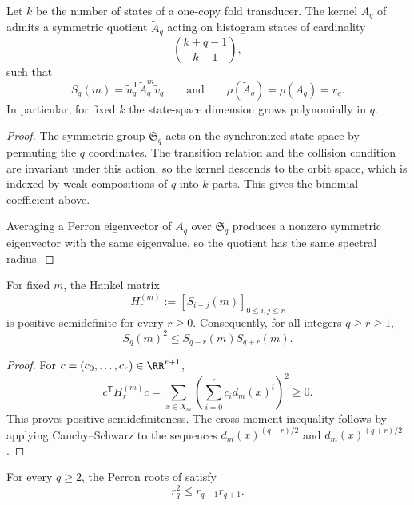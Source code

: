 \begin{theorem}
\label{thm:symmetric-compression}
Let \(k\) be the number of states of a one-copy fold transducer.  The kernel
\(A_q\) of  admits a symmetric quotient
\(\widetilde A_q\) acting on histogram states of cardinality
\[
  \binom{k+q-1}{k-1},
\]
such that
\[
  S_q(m)=\widetilde u_q^{\mathsf T}\widetilde A_q^m\widetilde v_q
  \qquad\text{and}\qquad
  \rho(\widetilde A_q)=\rho(A_q)=r_q.
\]
In particular, for fixed \(k\) the state-space dimension grows polynomially in
\(q\).
\end{theorem}

\begin{proof}
The symmetric group \(\mathfrak S_q\) acts on the synchronized state space by
permuting the \(q\) coordinates.  The transition relation and the collision
condition are invariant under this action, so the kernel descends to the orbit
space, which is indexed by weak compositions of \(q\) into \(k\) parts.  This
gives the binomial coefficient above.

Averaging a Perron eigenvector of \(A_q\) over \(\mathfrak S_q\) produces a
nonzero symmetric eigenvector with the same eigenvalue, so the quotient has the
same spectral radius.
\end{proof}

\begin{proposition}
\label{prop:hankel-psd}
For fixed \(m\), the Hankel matrix
\[
  H_r^{(m)}:=[S_{i+j}(m)]_{0\le i,j\le r}
\]
is positive semidefinite for every \(r\ge 0\).  Consequently, for all integers
\(q\ge r\ge 1\),
\[
  S_q(m)^2\le S_{q-r}(m)S_{q+r}(m).
\]
\end{proposition}

\begin{proof}
For \(c=(c_0,\dots,c_r)\in\RR^{r+1}\),
\[
  c^{\mathsf T}H_r^{(m)}c
  =
  \sum_{x\in X_m}\left(\sum_{i=0}^r c_i d_m(x)^i\right)^2\ge 0.
\]
This proves positive semidefiniteness.  The cross-moment inequality follows by
applying Cauchy--Schwarz to the sequences
\(d_m(x)^{(q-r)/2}\) and \(d_m(x)^{(q+r)/2}\).
\end{proof}

\begin{corollary}
\label{cor:cross-q-logconvex}
For every \(q\ge 2\), the Perron roots of  satisfy
\[
  r_q^2\le r_{q-1}r_{q+1}.
\]
\end{corollary}

